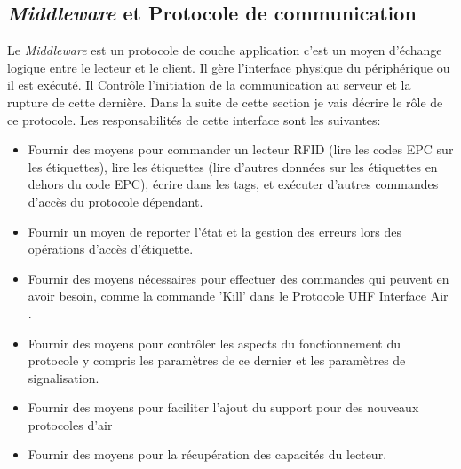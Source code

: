 \documentclass[11pt, a4paper, twoside]{book}
\begin{document}
\subsection{\emph{Middleware} et Protocole de communication}
Le \emph{Middleware} est un protocole de couche application c'est un moyen d'échange logique entre le lecteur et le client. Il gère l'interface physique du périphérique ou il est exécuté. Il Contrôle l'initiation de la communication au serveur et la rupture de cette dernière. Dans la suite de cette section je vais décrire le rôle de ce protocole. Les responsabilités de cette interface sont les suivantes:
\begin{itemize}
\item Fournir des moyens pour commander un lecteur RFID  (lire les codes EPC sur les étiquettes), lire les étiquettes (lire d'autres données sur les étiquettes en dehors du code EPC), écrire dans les tags, et exécuter d'autres commandes d'accès du protocole dépendant.
\item 
Fournir un moyen de reporter l'état et la gestion des erreurs lors des opérations d'accès d'étiquette.
\item 
Fournir des moyens nécessaires pour effectuer des commandes qui peuvent en avoir besoin, comme la commande 'Kill' dans le Protocole UHF Interface Air \cite{air}.
\item 
Fournir des moyens pour contrôler les aspects du fonctionnement du protocole y compris les paramètres de ce dernier et les paramètres de signalisation.
\item 
Fournir des moyens pour faciliter l'ajout du support pour des nouveaux protocoles d'air
\item 
Fournir des moyens pour la récupération des capacités du lecteur.\\
\end{itemize}
\end{document}
